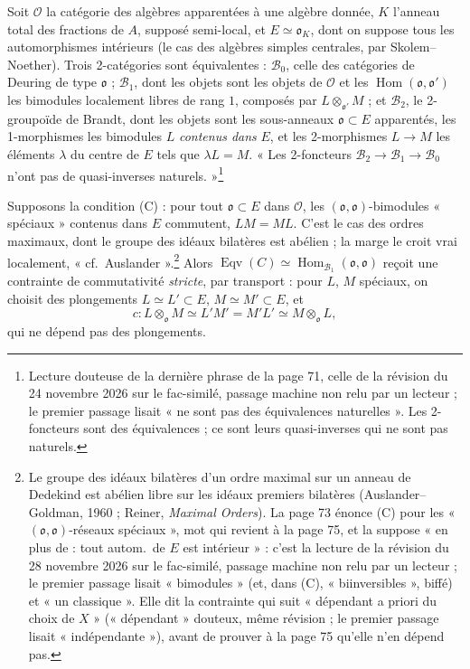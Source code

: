 \documentclass[11pt,a4paper]{article}
\begin{document}
Soit $\mathcal{O}$ la catégorie des algèbres apparentées à une algèbre donnée,
$K$ l'anneau total des fractions de $A$, supposé semi-local, et $E \simeq
\mathfrak{o}_{K}$, dont on suppose tous les automorphismes intérieurs (le cas
des algèbres simples centrales, par Skolem--Noether). Trois 2-catégories sont
équivalentes : $\mathcal{B}_{0}$, celle des catégories de Deuring de type
$\mathfrak{o}$ ; $\mathcal{B}_{1}$, dont les objets sont les objets de
$\mathcal{O}$ et les $\operatorname{Hom}(\mathfrak{o}, \mathfrak{o}')$ les
bimodules localement libres de rang $1$, composés par $L \otimes_{\mathfrak{o}'}
M$ ; et $\mathcal{B}_{2}$, le 2-groupoïde de Brandt, dont les objets sont les
sous-anneaux $\mathfrak{o} \subset E$ apparentés, les 1-morphismes les
bimodules $L$ \emph{contenus dans} $E$, et les 2-morphismes $L \to M$ les
éléments $\lambda$ du centre de $E$ tels que $\lambda L = M$. « Les 2-foncteurs
$\mathcal{B}_{2} \to \mathcal{B}_{1} \to \mathcal{B}_{0}$ n'ont pas de
quasi-inverses naturels. »\footnote{Lecture douteuse de la dernière phrase de
la page 71, celle de la révision du 24 novembre 2026 sur le fac-similé, passage
machine non relu par un lecteur ; le premier passage lisait « ne sont pas des
équivalences naturelles ». Les 2-foncteurs sont des équivalences ; ce sont
leurs quasi-inverses qui ne sont pas naturels.}

Supposons la condition (C) : pour tout $\mathfrak{o} \subset E$ dans
$\mathcal{O}$, les $(\mathfrak{o}, \mathfrak{o})$-bimodules « spéciaux » contenus
dans $E$ commutent, $LM = ML$. C'est le cas des ordres maximaux, dont le groupe
des idéaux bilatères est abélien ; la marge le croit vrai localement, « cf.\
Auslander ».\footnote{Le groupe des idéaux bilatères d'un ordre maximal sur un
anneau de Dedekind est abélien libre sur les idéaux premiers bilatères
(Auslander--Goldman, 1960 ; Reiner, \emph{Maximal Orders}). La page 73 énonce
(C) pour les « $(\mathfrak{o}, \mathfrak{o})$-réseaux spéciaux », mot qui revient
à la page 75, et la suppose « en plus de : tout autom.\ de $E$ est intérieur » :
c'est la lecture de la révision du 28 novembre 2026 sur le fac-similé, passage machine non relu par un lecteur ; le premier passage lisait « bimodules » (et, dans
(C), « biinversibles », biffé) et « un classique ». Elle dit la contrainte
qui suit « dépendant a priori du choix de $X$ » (« dépendant » douteux, même
révision ; le premier passage lisait « indépendante »), avant de prouver à la
page 75 qu'elle n'en dépend pas.} Alors
$\operatorname{Eqv}(C) \simeq \operatorname{Hom}_{\mathcal{B}_{1}}(\mathfrak{o},
\mathfrak{o})$ reçoit une contrainte de commutativité \emph{stricte}, par
transport : pour $L$, $M$ spéciaux, on choisit des plongements $L \simeq L'
\subset E$, $M \simeq M' \subset E$, et
\[
  c \colon L \otimes_{\mathfrak{o}} M \simeq L'M' = M'L' \simeq M
  \otimes_{\mathfrak{o}} L ,
\]
qui ne dépend pas des plongements.
\end{document}
